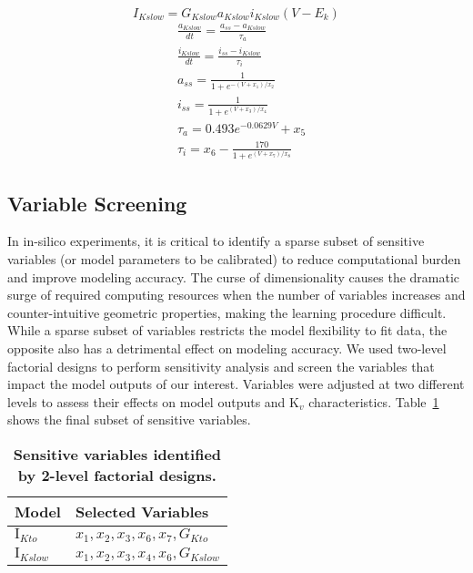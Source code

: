 \documentclass[10pt,letterpaper]{article}
\begin{document}
\begin{equation}
    I_{Kslow} = G_{Kslow}a_{Kslow}i_{Kslow}(V-E_k)
    \label{eq6}
\end{equation}
\begin{align*}
    &\frac{a_{Kslow}}{dt} = \frac{a_{ss}-a_{Kslow}}{\tau_{a}} \\
    &\frac{i_{Kslow}}{dt} = \frac{i_{ss}-i_{Kslow}}{\tau_{i}} \\
    &a_{ss} = \frac{1}{1+e^{-(V+x_1)/x_2}} \\
    &i_{ss} = \frac{1}{1+e^{(V+x_3)/x_4}} \\
    &\tau_{a} = 0.493 e^{-0.0629V}+x_5 \\
    &\tau_{i} = x_6 - \frac{170}{1+e^{(V+x_7)/x_8}}
\end{align*}

\subsection*{Variable Screening}
In in-silico experiments, it is critical to identify a sparse subset of sensitive variables (or model parameters to be calibrated) to reduce computational burden and improve modeling accuracy. The curse of dimensionality causes the dramatic surge of required computing resources when the number of variables increases and counter-intuitive geometric properties, making the learning procedure difficult. While a sparse subset of variables restricts the model flexibility to fit data, the opposite also has a detrimental effect on modeling accuracy. We used two-level factorial designs to perform sensitivity analysis and screen the variables that impact the model outputs of our interest. Variables were adjusted at two different levels to assess their effects on model outputs and $\text{K}_{v}$ characteristics. Table~\ref{table1} shows the final subset of sensitive variables.

\begin{table}
    \centering
    \caption{\bf{Sensitive variables identified by 2-level factorial designs.}}
    \begin{tabular}{ll}
        \hline
        Model & Selected Variables  \\ 
        \hline
        $\text{I}_{Kto}$ & $x_1, x_2, x_3, x_6, x_7, G_{Kto}$ \\
        $\text{I}_{Kslow}$ & $x_1, x_2, x_3, x_4, x_6, G_{Kslow}$ \\
        \hline
    \end{tabular}
    \label{table1}
\end{table}
\end{document}
